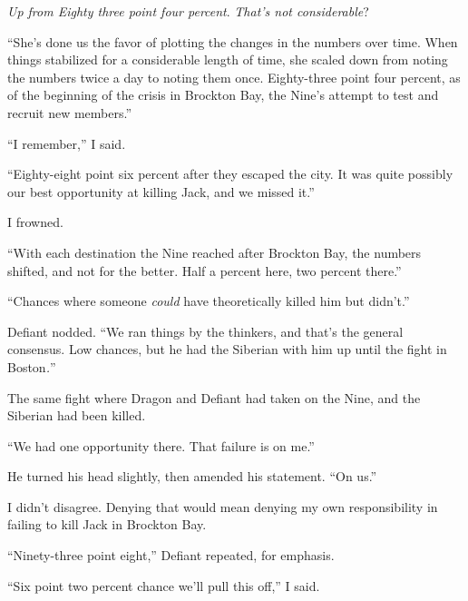 \emph{Up from Eighty three point four percent}.  \emph{That's not considerable}?



``She's done us the favor of plotting the changes in the numbers over time.  When things stabilized for a considerable length of time, she scaled down from noting the numbers twice a day to noting them once.  Eighty-three point four percent, as of the beginning of the crisis in Brockton Bay, the Nine's attempt to test and recruit new members.''



``I remember,'' I said.



``Eighty-eight point six percent after they escaped the city.  It was quite possibly our best opportunity at killing Jack, and we missed it.''



I frowned.



``With each destination the Nine reached after Brockton Bay, the numbers shifted, and not for the better.  Half a percent here, two percent there.''



``Chances where someone \emph{could} have theoretically killed him but didn't.''



Defiant nodded.  ``We ran things by the thinkers, and that's the general consensus.  Low chances, but he had the Siberian with him up until the fight in Boston\emph{.}''



The same fight where Dragon and Defiant had taken on the Nine, and the Siberian had been killed.



``We had one opportunity there.  That failure is on me.''



He turned his head slightly, then amended his statement.  ``On us.''



I didn't disagree.  Denying that would mean denying my own responsibility in failing to kill Jack in Brockton Bay.



``Ninety-three point eight,'' Defiant repeated, for emphasis.



``Six point two percent chance we'll pull this off,'' I said.



